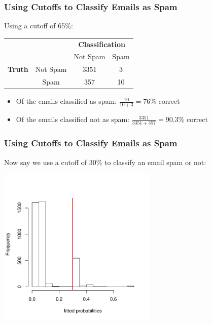 \documentclass[handout]{beamer}
\newcommand{\blue}[1]{\textcolor{blue2}{#1}}
\begin{document}
\begin{frame}[fragile]
\frametitle{Using Cutoffs to Classify Emails as Spam}

Using a cutoff of 65\%:
\begin{center}
  \begin{tabular}{cc|cc}
     \multicolumn{2}{c}{}  & \multicolumn{2}{c}{\textbf{Classification}} \\ 
     &  & Not Spam & Spam \\ 
\hline
    \textbf{Truth} & Not Spam & 3351 & 3\\
     & Spam & 357 & 10\\ 
    \hline
  \end{tabular}
\end{center}
%
%
\pause
\begin{itemize}
\item Of the emails classified as spam:  $\frac{10}{10+3} = 76\%$ correct
\item Of the emails classified not as spam:  $\frac{3351}{3351+357} = 90.3\%$ correct
\end{itemize}


\end{frame}


\begin{frame}[fragile]
\frametitle{Using Cutoffs to Classify Emails as Spam}

Now say we use a cutoff of 30\% to \blue{classify} an email spam or not:
\begin{center}
\includegraphics[width=3in]{figure/fitted3.pdf}
\end{center}

\end{frame}
\end{document}
